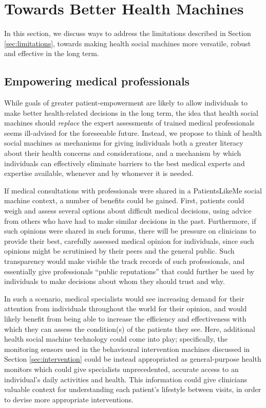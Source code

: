 \documentclass{sig-alternate}
\begin{document}
\section{Towards Better Health Machines}

In this section, we discuss ways to address the limitations described
in Section \ref{sec:limitations}, towards making health social
machines more versatile, robust and effective in the long term.

\subsection{Empowering medical professionals}

While goals of greater patient-empowerment are likely to allow
individuals to make better health-related decisions in the long term,
the idea that health social machines should \emph{replace} the expert
assessments of trained medical professionals seems ill-advised for the
foreseeable future. Instead, we propose to think of health social
machines as mechanisms for giving individuals both a greater literacy
about their health concerns and considerations, and a mechanism by
which individuals can effectively eliminate barriers to the best
medical experts and expertise available, whenever and by whomever it
is needed.

If medical consultations with professionals were shared in a
PatientsLikeMe social machine context, a number of benefits could be
gained.  First, patients could weigh and assess several options about
difficult medical decisions, using advice from others who have had to
make similar decisions in the past.  Furthermore, if such opinions
were shared in such forums, there will be pressure on clinicians to
provide their best, carefully assessed medical opinion for
individuals, since such opinions might be scrutinised by their peers
and the general public.  Such transparency would make visible the
track records of such professionals, and essentially give
professionals ``public reputations'' that could further be used by
individuals to make decisions about whom they should trust and why.

In such a scenario, medical specialists would see increasing demand
for their attention from individuals throughout the world for their
opinion, and would likely benefit from being able to increase the
efficiency and effectiveness with which they can assess the
condition(s) of the patients they see.  Here, additional health social
machine technology could come into play; specifically, the monitoring
sensors used in the behavioural intervention machines discussed in
Section \ref{sec:intervention} could be instead appropriated as
general-purpose health monitors which could give specialists
unprecedented, accurate access to an individual's daily activities and
health.  This information could give clinicians valuable context for
understanding each patient's lifestyle between visits, in order to
devise more appropriate interventions.
\end{document}
